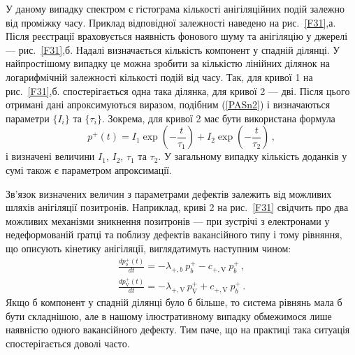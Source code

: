 \documentclass[10pt,a5paper,titlepage,oneside]{book}
\numberwithin{equation}{part}
\begin{document}
У даному випадку спектром є гістограма кількості анігіляційних подій залежно від проміжку часу.
Приклад відповідної залежності наведено на рис.~\ref{F31},а.
Після реєстрації враховується наявність фонового шуму та анігіляцію у джерелі --- рис.~\ref{F31},б.
Надалі визначається кількість компонент у спадній ділянці.
У найпростішому випадку це можна зробити за кількістю лінійних ділянок на логарифмічній залежності
кількості подій від часу.
Так, для кривої 1 на рис.~\ref{F31},б. спостерігається одна така ділянка,
для кривої 2 --- дві.
Після цього отримані дані апроксимуються виразом, подібним (\ref{PASn2}) і визначаються параметри $\{I_i\}$ та $\{\tau_i\}$.
Зокрема, для кривої 2 має бути використана формула
\begin{equation*}
p^+(t)=I_1\exp\left(-\frac{t}{\tau_1}\right)+I_2\exp\left(-\frac{t}{\tau_2}\right)\,,
\end{equation*}
і визначені величини $I_1$, $I_2$, $\tau_1$ та $\tau_2$.
У загальному випадку кількість доданків у сумі також є параметром апроксимації.

Зв'язок визначених величин з параметрами дефектів залежить від можливих шляхів анігіляції позитронів.
Наприклад, криві 2 на рис.~\ref{F31} свідчить про два можливих механізми зникнення позитронів --- при зустрічі з електронами
у недеформованій ґратці та поблизу дефектів вакансійного типу і
тому рівняння, що описують кінетику анігіляції, виглядатимуть наступним чином:
\begin{gather}
 \frac{dp_{b}^+(t)}{dt}= -\lambda_{+,b}\:p_{b}^+ - c_{+,\mathrm{V}} \:p_{b}^+ \,, \label{PASnb1}\\
\frac{dp_{\mathrm{V}}^+(t)}{dt}= - \lambda_{+,\mathrm{V}}\,p_{\mathrm{V}}^+ + c_{+,\mathrm{V}} \:p_{b}^+ \,.\label{PASnv1}
\end{gather}
Якщо б компонент у спадній ділянці було б більше, то система рівнянь мала б бути складнішою,
але в нашому ілюстративному випадку обмежимося лише наявністю одного вакансійного дефекту.
Тим паче, що на практиці така ситуація спостерігається доволі часто.
\end{document}
